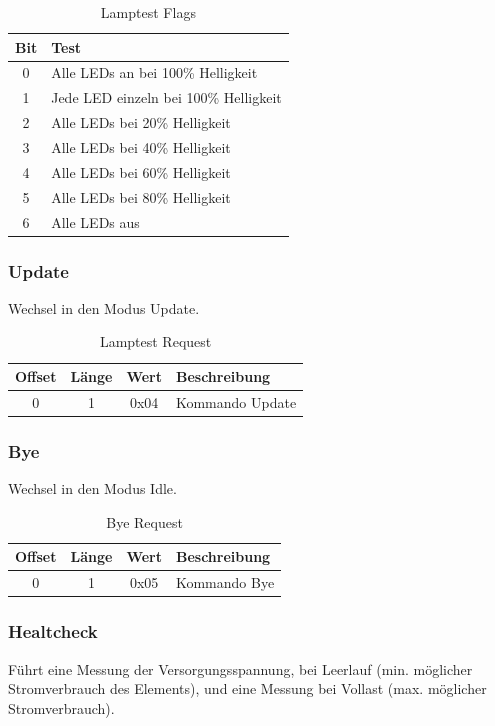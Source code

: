 \documentclass[10pt,a4paper]{article}
\begin{document}
\begin{table}[H]
\label{LAMPTEST_FLAGS}
\centering
\begin{tabular}{c|l}
\textbf{Bit} & \textbf{Test} \\ \hline
0 & Alle LEDs an bei 100\% Helligkeit\\
1 & Jede LED einzeln bei 100\% Helligkeit\\
2 & Alle LEDs bei 20\% Helligkeit\\
3 & Alle LEDs bei 40\% Helligkeit\\
4 & Alle LEDs bei 60\% Helligkeit\\
5 & Alle LEDs bei 80\% Helligkeit\\
6 & Alle LEDs aus
\end{tabular}
\caption{Lamptest Flags}
\end{table}

\subsubsection{Update}
\label{sec:Update}
Wechsel in den Modus Update.
\begin{table}[H]
\centering
\begin{tabular}{c|c|c|l}
\textbf{Offset} & \textbf{Länge} & \textbf{Wert} & \textbf{Beschreibung} \\ \hline
0 & 1 & 0x04 & Kommando Update
\end{tabular}
\caption{Lamptest Request}
\end{table}

\subsubsection{Bye}
\label{sec:Bye}
Wechsel in den Modus Idle.
\begin{table}[H]
\centering
\begin{tabular}{c|c|c|l}
\textbf{Offset} & \textbf{Länge} & \textbf{Wert} & \textbf{Beschreibung} \\ \hline
0 & 1 & 0x05 & Kommando Bye
\end{tabular}
\caption{Bye Request}
\end{table}

\subsubsection{Healtcheck}
\label{sec:Healthcheck}
Führt eine Messung der Versorgungsspannung, bei Leerlauf (min. möglicher Stromverbrauch des Elements), und eine Messung bei Vollast (max. möglicher Stromverbrauch). 
\end{document}
